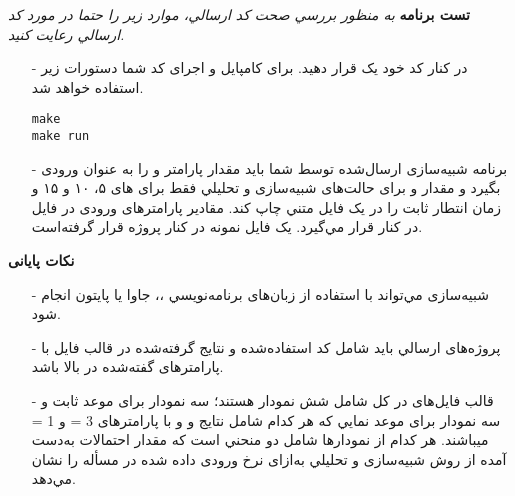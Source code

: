 \documentclass[12pt]{article}
\begin{document}
	\textbf{تست برنامه}
	\newline
    \textit{به منظور بررسي صحت کد ارسالي، موارد زیر را حتما در مورد کد ارسالي رعایت کنید.}
	\begin{itemize}
	\item[-]
در کنار کد خود یک  قرار دهید. برای کامپایل و اجرای کد شما دستورات زیر استفاده خواهد شد.
    \begin{latin}
		\texttt{make}\\
		\texttt{make run}
	\end{latin}
    \item[-]
    برنامه شبیه‌سازی ارسال‌شده توسط شما باید مقدار پارامتر \lr{$\theta$} و \lr{$\mu$} را به عنوان ورودی بگیرد و مقدار  و  برای حالت‌های
شبیه‌سازی و تحلیلي فقط برای \lr{$\lambda$} های ۵، ۱۰ و ۱۵ و زمان انتطار ثابت را در یک فایل متني چاپ کند. مقادیر پارامترهای ورودی در فایل  در کنار  قرار مي‌گیرد. یک فایل نمونه در کنار پروژه قرار گرفته‌است.
    \end{itemize}
    
    \newpage
    \textbf{نکات پایانی}
    \begin{itemize}
	\item[-]
	شبیه‌سازی مي‌تواند با استفاده از زبان‌های برنامه‌نویسي  ،، جاوا یا پایتون انجام شود.
	\item[-]
	پروژه‌های ارسالي باید شامل کد استفاده‌شده و نتایج گرفته‌شده در قالب فایل  با پارامترهای گفته‌شده در بالا
باشد.
    \item[-]
    قالب فایل‌های  در کل شامل شش نمودار هستند؛ سه نمودار برای موعد ثابت و سه نمودار برای موعد نمایي که هر
کدام شامل نتایج  و  و  با پارامترهای 3 = \lr{$\theta$} و 1 = \lr{$\mu$} ميباشند. هر کدام از نمودارها شامل دو منحني است که
مقدار احتمالات به‌دست آمده از روش شبیه‌سازی و تحلیلي به‌ازای نرخ ورودی داده شده در مسأله را نشان مي‌دهد.
	\end{itemize}
	
\end{document}
